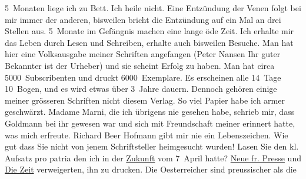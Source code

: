 \begin{ledgroupsized}[t]{13cm}
               5 Monaten liege ich zu Bett. Ich heile nicht. Eine Entzündung der Venen folgt bei mir
               immer der anderen, bisweilen bricht die Entzündung auf ein Mal an drei Stellen aus.
               5 Monate im Gefängnis machen eine lange öde Zeit. Ich erhalte mir das Leben {\pb}durch Lesen und Schreiben, erhalte
               auch bisweilen Besuche. Man hat hier eine Volksausgabe meiner Schriften angefangen (Peter Nansen Ihr guter Bekannter ist der
               Urheber) und sie scheint Erfolg zu haben. Man hat circa 5000 Subscribenten und druckt
               6000 Exemplare. Es erscheinen alle 14 Tage 10 Bogen, und es wird etwas über 3 Jahre
               dauern. Dennoch gehören einige meiner grösseren Schriften nicht diesem Verlag. So
               viel Papier habe ich armer geschwärzt.\pend
           \pstart
           Madame Marni, die ich übrigens nie gesehen
               habe, schrieb mir, dass Goldmann bei ihr
               gewesen war und sich mit Freundschaft meiner erinnert hatte, was mich erfreute. Richard Beer Hofmann gibt mir nie {\pb}ein Lebenszeichen.\pend
           \pstart
           Wie gut dass Sie nicht von jenem Schriftsteller heimgesucht wurden! Lasen Sie den kl.
                  Aufsatz pro patria den ich
               in der \uline{Zukunft} vom 7 April hatte? \uline{Neue fr. Presse} und \uline{Die Zeit} verweigerten, ihn zu drucken. Die Oesterreicher sind preussischer als die

\end{ledgroupsized}
